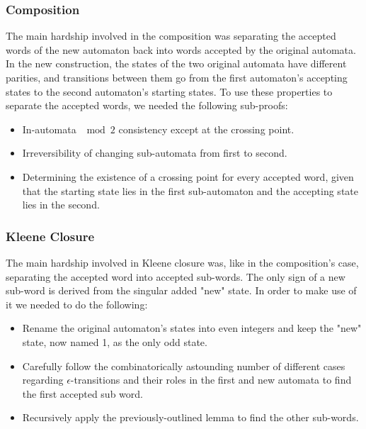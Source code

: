 \documentclass[]{article}
\begin{document}
\subsubsection{Composition}
The main hardship involved in the composition was separating the accepted words of the new automaton back into words accepted by the original automata. In the new construction, the states of the two original automata have different parities, and transitions between them go from the first automaton's accepting states to the second automaton's starting states. To use these properties to separate the accepted words, we needed the following sub-proofs:
\begin{itemize}
	\item
	In-automata $\mod 2$ consistency except at the crossing point.
	\item 
	Irreversibility of changing sub-automata from first to second.
	\item 
	Determining the existence of a crossing point for every accepted word, given that the starting state lies in the first sub-automaton and the accepting state lies in the second.
\end{itemize}
\subsubsection{Kleene Closure}
The main hardship involved in Kleene closure was, like in the composition's case, separating the accepted word into accepted sub-words. The only sign of a new sub-word is derived from the singular added "new" state. In order to make use of it we needed to do the following:
\begin{itemize}
	\item 
	Rename the original automaton’s states into even integers and keep the "new" state, now named 1, as the only odd state.
	\item 
	Carefully follow the combinatorically astounding number of different cases regarding $\epsilon$-transitions and their roles in the first and new automata to find the first accepted sub word.
	\item 
	Recursively apply the previously-outlined lemma to find the other sub-words.
\end{itemize}
\end{document}
